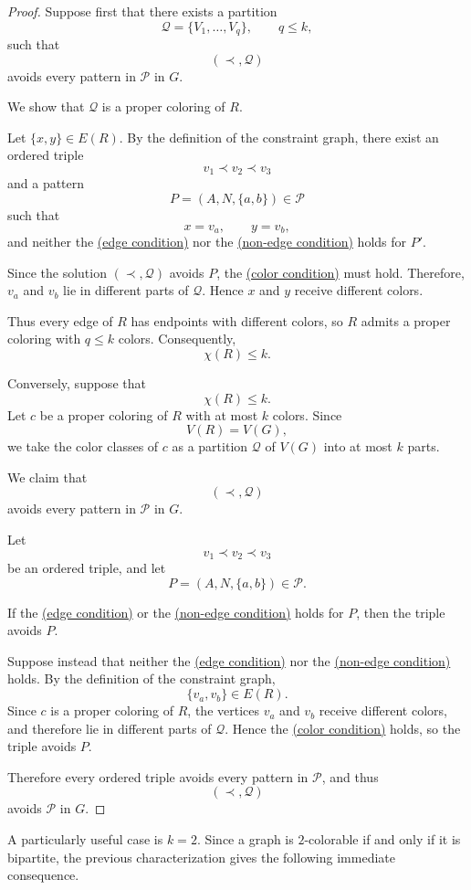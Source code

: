 \documentclass[12pt]{article}
\theoremstyle{plain}
\theoremstyle{definition}
\theoremstyle{remark}
\theoremstyle{definition}
\newcommand{\edgecondition}{%
  \hyperref[def:avoid:cond:edge]{(edge condition)}\xspace
}
\newcommand{\nonedgecondition}{%
  \hyperref[def:avoid:cond:nonedge]{(non-edge condition)}\xspace
}
\newcommand{\colorcondition}{%
  \hyperref[def:avoid:cond:color]{(color condition)}\xspace
}
\begin{document}
\begin{proof}
Suppose first that there exists a partition
\[
\mathcal Q=\{V_1,\dots,V_q\},
\qquad
q\le k,
\]
such that
\[
(\prec,\mathcal Q)
\]
avoids every pattern in \(\mathcal P\) in \(G\).

We show that \(\mathcal Q\) is a proper coloring of \(R\).

Let
\(
\{x,y\}\in E(R).
\)
By the definition of the constraint graph, there exist an ordered triple
\[
v_1\prec v_2\prec v_3
\]
and a pattern
\[
P=(A,N,\{a,b\})\in\mathcal P
\]
such that
\[
x=v_a,
\qquad
y=v_b,
\]
and neither the \edgecondition{} nor the \nonedgecondition{} holds for
\(P'\).

Since the solution \((\prec,\mathcal Q)\) avoids \(P\), the
\colorcondition{} must hold. Therefore, \(v_a\) and \(v_b\) lie in
different parts of \(\mathcal Q\). Hence \(x\) and \(y\) receive different
colors.

Thus every edge of \(R\) has endpoints with different colors, so \(R\)
admits a proper coloring with \(q\le k\) colors. Consequently,
\[
\chi(R)\le k.
\]

Conversely, suppose that
\[
\chi(R)\le k.
\]
Let \(c\) be a proper coloring of \(R\) with at most \(k\) colors.
Since
\[
V(R)=V(G),
\]
we take the color classes of \(c\) as a partition \(\mathcal Q\) of
\(V(G)\) into at most \(k\) parts.

We claim that
\[
(\prec,\mathcal Q)
\]
avoids every pattern in \(\mathcal P\) in \(G\).

Let
\[
v_1\prec v_2\prec v_3
\]
be an ordered triple, and let
\[
P=(A,N,\{a,b\})\in\mathcal P.
\]

If the \edgecondition{} or the \nonedgecondition{} holds for \(P\), then
the triple avoids \(P\).

Suppose instead that neither the \edgecondition{} nor the
\nonedgecondition{} holds. By the definition of the constraint graph,
\[
\{v_a,v_b\}\in E(R).
\]
Since \(c\) is a proper coloring of \(R\), the vertices \(v_a\) and \(v_b\)
receive different colors, and therefore lie in different parts of
\(\mathcal Q\). Hence the \colorcondition{} holds, so the triple avoids
\(P\).

Therefore every ordered triple avoids every pattern in \(\mathcal P\), and
thus
\[
(\prec,\mathcal Q)
\]
avoids \(\mathcal P\) in \(G\).
\end{proof}




A particularly useful case is \(k=2\). Since a graph is \(2\)-colorable
if and only if it is bipartite, the previous characterization gives the
following immediate consequence.
\end{document}
